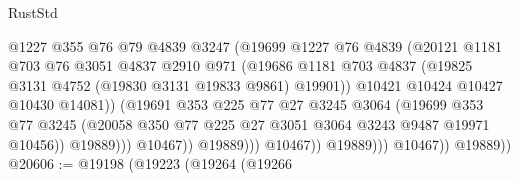 \begin{lexlean}{RustStd}
\begin{coremodule}
                                    @1227
                                    @355
                                    @76
                                    @79
                                    @4839
                                    @3247
                                    (@19699
                                      @1227
                                      @76
                                      @4839
                                      (@20121
                                        @1181
                                        @703
                                        @76
                                        @3051
                                        @4837
                                        @2910
                                        @971
                                        (@19686
                                          @1181
                                          @703
                                          @4837
                                          (@19825 @3131 @4752 (@19830 @3131 @19833 @9861) @19901))
                                        @10421
                                        @10424
                                        @10427
                                        @10430
                                        @14081))
                                    (@19691
                                      @353
                                      @225
                                      @77
                                      @27
                                      @3245
                                      @3064
                                      (@19699
                                        @353
                                        @77
                                        @3245
                                        (@20058
                                          @350
                                          @77
                                          @225
                                          @27
                                          @3051
                                          @3064
                                          @3243
                                          @9487
                                          @19971
                                          @10456))
                                      @19889)))
                                @10467))
                            @19889)))
                      @10467))
                  @19889)))
            @10467))
        @19889))
@20606 := @19198
    (@19223
      (@19264
        (@19266

\end{coremodule}
\end{lexlean}
